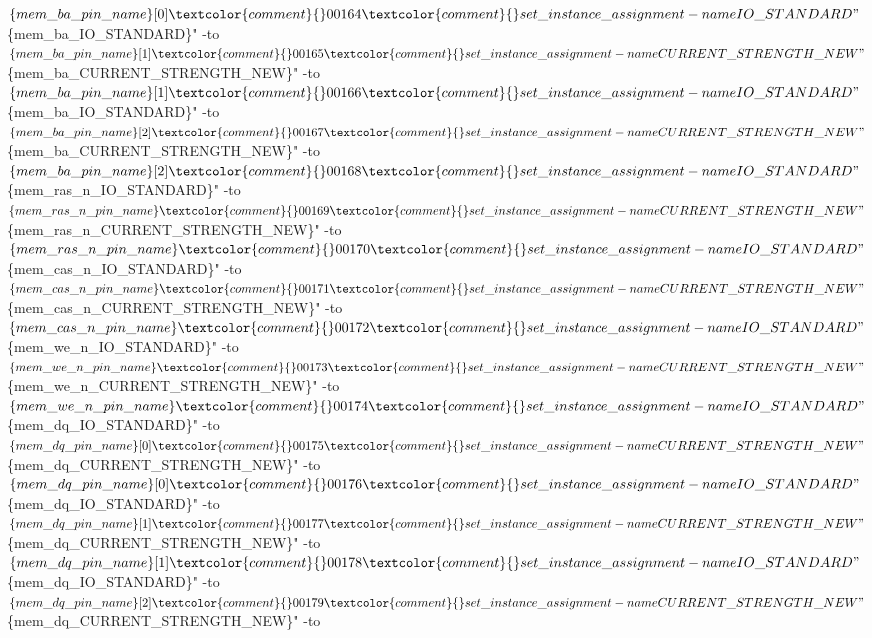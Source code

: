 \begin{DoxyCode}
      $\{mem\_ba\_pin\_name\}[0]\textcolor{comment}{}
00164 \textcolor{comment}{}set\_instance\_assignment -name IO\_STANDARD "$\{mem\_ba\_IO\_STANDARD\}" -to $\{mem\_ba\_pin\_name\}[1]\textcolor{comment}{}
00165 \textcolor{comment}{}set\_instance\_assignment -name CURRENT\_STRENGTH\_NEW "$\{mem\_ba\_CURRENT\_STRENGTH\_NEW\}" -to 
      $\{mem\_ba\_pin\_name\}[1]\textcolor{comment}{}
00166 \textcolor{comment}{}set\_instance\_assignment -name IO\_STANDARD "$\{mem\_ba\_IO\_STANDARD\}" -to $\{mem\_ba\_pin\_name\}[2]\textcolor{comment}{}
00167 \textcolor{comment}{}set\_instance\_assignment -name CURRENT\_STRENGTH\_NEW "$\{mem\_ba\_CURRENT\_STRENGTH\_NEW\}" -to 
      $\{mem\_ba\_pin\_name\}[2]\textcolor{comment}{}
00168 \textcolor{comment}{}set\_instance\_assignment -name IO\_STANDARD "$\{mem\_ras\_n\_IO\_STANDARD\}" -to $\{mem\_ras\_n\_pin\_name\}\textcolor{comment}{}
00169 \textcolor{comment}{}set\_instance\_assignment -name CURRENT\_STRENGTH\_NEW "$\{mem\_ras\_n\_CURRENT\_STRENGTH\_NEW\}" -to 
      $\{mem\_ras\_n\_pin\_name\}\textcolor{comment}{}
00170 \textcolor{comment}{}set\_instance\_assignment -name IO\_STANDARD "$\{mem\_cas\_n\_IO\_STANDARD\}" -to $\{mem\_cas\_n\_pin\_name\}\textcolor{comment}{}
00171 \textcolor{comment}{}set\_instance\_assignment -name CURRENT\_STRENGTH\_NEW "$\{mem\_cas\_n\_CURRENT\_STRENGTH\_NEW\}" -to 
      $\{mem\_cas\_n\_pin\_name\}\textcolor{comment}{}
00172 \textcolor{comment}{}set\_instance\_assignment -name IO\_STANDARD "$\{mem\_we\_n\_IO\_STANDARD\}" -to $\{mem\_we\_n\_pin\_name\}\textcolor{comment}{}
00173 \textcolor{comment}{}set\_instance\_assignment -name CURRENT\_STRENGTH\_NEW "$\{mem\_we\_n\_CURRENT\_STRENGTH\_NEW\}" -to 
      $\{mem\_we\_n\_pin\_name\}\textcolor{comment}{}
00174 \textcolor{comment}{}set\_instance\_assignment -name IO\_STANDARD "$\{mem\_dq\_IO\_STANDARD\}" -to $\{mem\_dq\_pin\_name\}[0]\textcolor{comment}{}
00175 \textcolor{comment}{}set\_instance\_assignment -name CURRENT\_STRENGTH\_NEW "$\{mem\_dq\_CURRENT\_STRENGTH\_NEW\}" -to 
      $\{mem\_dq\_pin\_name\}[0]\textcolor{comment}{}
00176 \textcolor{comment}{}set\_instance\_assignment -name IO\_STANDARD "$\{mem\_dq\_IO\_STANDARD\}" -to $\{mem\_dq\_pin\_name\}[1]\textcolor{comment}{}
00177 \textcolor{comment}{}set\_instance\_assignment -name CURRENT\_STRENGTH\_NEW "$\{mem\_dq\_CURRENT\_STRENGTH\_NEW\}" -to 
      $\{mem\_dq\_pin\_name\}[1]\textcolor{comment}{}
00178 \textcolor{comment}{}set\_instance\_assignment -name IO\_STANDARD "$\{mem\_dq\_IO\_STANDARD\}" -to $\{mem\_dq\_pin\_name\}[2]\textcolor{comment}{}
00179 \textcolor{comment}{}set\_instance\_assignment -name CURRENT\_STRENGTH\_NEW "$\{mem\_dq\_CURRENT\_STRENGTH\_NEW\}" -to 

\end{DoxyCode}
